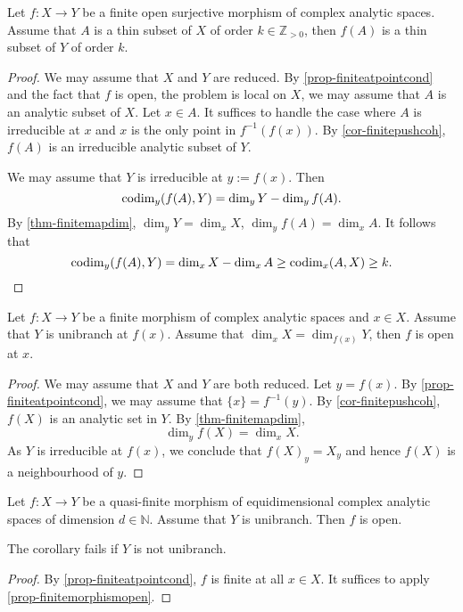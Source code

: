 \begin{corollary}\label{cor-finiteopensurjthinsetpre}
    Let $f:X\rightarrow Y$ be a finite open surjective morphism of complex analytic spaces. Assume that $A$ is a thin subset of $X$ of order $k\in \mathbb{Z}_{>0}$, then $f(A)$ is a thin subset of $Y$ of order $k$.
\end{corollary}
\begin{proof}
    We may assume that $X$ and $Y$ are reduced.
    By \cref{prop-finiteatpointcond} and the fact that $f$ is open, the problem is local on $X$, we may assume that $A$ is an analytic subset of $X$. Let $x\in A$. It suffices to handle the case where $A$ is irreducible at $x$ and $x$ is the only point in $f^{-1}(f(x))$.
    By \cref{cor-finitepushcoh}, $f(A)$ is an irreducible analytic subset of $Y$.

    We may assume that $Y$ is irreducible at $y:=f(x)$. Then
    \[
        \operatorname{codim}_y(f(A),Y)=\dim_y Y-\dim_y f(A).  
    \]
    By \cref{thm-finitemapdim}, $\dim_y Y=\dim_x X$, $\dim_y f(A)=\dim_x A$. It follows that
    \[
        \operatorname{codim}_y(f(A),Y)=\dim_x X-\dim_x A  \geq \operatorname{codim}_x(A,X)\geq k.
    \]
\end{proof}

\begin{proposition}\label{prop-finitemorphismopen}
    Let $f:X\rightarrow Y$ be a finite morphism of complex analytic spaces and $x\in X$. Assume that $Y$ is unibranch at $f(x)$. Assume that $\dim_x X=\dim_{f(x)}Y$, then $f$ is open at $x$.
\end{proposition}
\begin{proof}
    We may assume that $X$ and $Y$ are both reduced. Let $y=f(x)$. By \cref{prop-finiteatpointcond}, we may assume that $\{x\}=f^{-1}(y)$. By \cref{cor-finitepushcoh}, $f(X)$ is an analytic set in $Y$. By \cref{thm-finitemapdim},
    \[
        \dim_y f(X)=\dim_x X.  
    \]
    As $Y$ is irreducible at $f(x)$, we conclude that $f(X)_y=X_y$ and hence $f(X)$ is a neighbourhood of $y$.
\end{proof}
\begin{corollary}\label{cor-quasifiniemoropen}
    Let $f:X\rightarrow Y$ be a quasi-finite morphism of equidimensional complex analytic spaces of dimension $d\in \mathbb{N}$. Assume that $Y$ is unibranch. Then $f$ is open. 
\end{corollary}
The corollary fails if $Y$ is not unibranch.
\begin{proof}
    By \cref{prop-finiteatpointcond}, $f$ is finite at all $x\in X$. It suffices to apply \cref{prop-finitemorphismopen}.
\end{proof}



